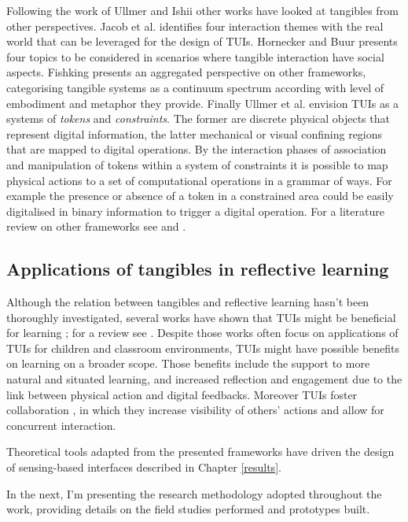 Following the work of Ullmer and Ishii other works have looked at tangibles from other perspectives. Jacob et al. \autocite*{Jacob:2008vm} identifies four interaction themes with the real world that can be leveraged for the design of TUIs. Hornecker and Buur \autocite*{Hornecker:2006uq} presents four topics to be considered in scenarios where tangible interaction have social aspects. Fishking \autocite{Fishkin:2004uv} presents an aggregated perspective on other frameworks, categorising tangible systems as a continuum spectrum according with level of embodiment and metaphor they provide. Finally Ullmer et al. \autocite{Ullmer:2005jz} envision TUIs as a systems of \emph{tokens} and \emph{constraints}. The former are discrete physical objects that represent digital information, the latter mechanical or visual confining regions that are mapped to digital operations. By the interaction phases of association and manipulation of tokens within a system of constraints it is possible to map physical actions to a set of computational operations in a grammar of ways. For example the presence or absence of a token in a constrained area could be easily digitalised in binary information to trigger a digital operation. For a literature review on other frameworks see \autocite{Mazalek:2009uy} and \autocite{Shaer:2009fx}.

\subsection{Applications of tangibles in reflective learning}\label{applications-of-tangibles-in-reflective-learning}

Although the relation between tangibles and reflective learning hasn't been thoroughly investigated, several works have shown that TUIs might be beneficial for learning \autocite{Marshall:2007dr}; for a review see \autocite{omalley:hal-00190328}. Despite those works often focus on applications of TUIs for children and classroom environments, TUIs might have possible benefits on learning on a broader scope. Those benefits include the support to more natural \autocite{Terrenghi:2005gq} and situated \autocite{Klemmer:2006ez} learning, and increased reflection and engagement \autocite{Rogers:2006te} due to the link between physical action and digital feedbacks. Moreover TUIs foster collaboration \autocite{Rogers:2003tt}, in which they increase visibility of others' actions and allow for concurrent interaction.

Theoretical tools adapted from the presented frameworks have driven the design of sensing-based interfaces described in Chapter \ref{results}.

In the next, I'm presenting the research methodology adopted throughout the work, providing details on the field studies performed and prototypes built. 
